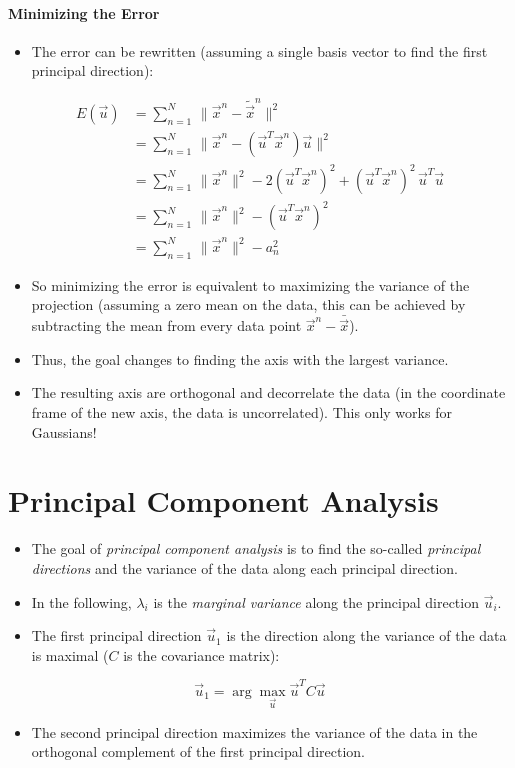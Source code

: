 		\paragraph{Minimizing the Error}
			\begin{itemize}
				\item The error can be rewritten (assuming a single basis vector to find the first principal direction):
			\end{itemize}
			\begin{align}
				E(\vec{u}) &= \sum_{n = 1}^{N} \, \lVert \vec{x}^n - \tilde{\vec{x}}^n \rVert^2 \\
					&= \sum_{n = 1}^{N} \, \lVert \vec{x}^n - (\vec{u}^T \vec{x}^n) \vec{u} \rVert^2 \\
					&= \sum_{n = 1}^{N} \, \lVert \vec{x}^n \rVert^2 - 2 (\vec{u}^T \vec{x}^n)^2 + (\vec{u}^T \vec{x}^n)^2 \, \vec{u}^T \vec{u} \\
					&= \sum_{n = 1}^{N} \, \lVert \vec{x}^n \rVert^2 - (\vec{u}^T \vec{x}^n)^2 \\
					&= \sum_{n = 1}^{N} \, \lVert \vec{x}^n \rVert^2 - a_n^2
			\end{align}
			\begin{itemize}
				\item So minimizing the error is equivalent to maximizing the variance of the projection (assuming a zero mean on the data, this can be achieved by subtracting the mean from every data point \( \vec{x}^n - \bar{\vec{x}} \)).
				\item Thus, the goal changes to finding the axis with the largest variance.
				\item The resulting axis are orthogonal and decorrelate the data (in the coordinate frame of the new axis, the data is uncorrelated). This only works for Gaussians!
			\end{itemize}

	\section{Principal Component Analysis}
		\begin{itemize}
			\item The goal of \emph{principal component analysis} is to find the so-called \emph{principal directions} and the variance of the data along each principal direction.
			\item In the following, \( \lambda_i \) is the \emph{marginal variance} along the principal direction \(\vec{u}_i\).
			\item The first principal direction \(\vec{u}_1\) is the direction along the variance of the data is maximal (\(C\) is the covariance matrix):
		\end{itemize}
		\begin{equation}
			\vec{u}_1 = \arg\max\limits_{\vec{u}} \vec{u}^T C \vec{u}
		\end{equation}
		\begin{itemize}
			\item The second principal direction maximizes the variance of the data in the orthogonal complement of the first principal direction.
		\end{itemize}

